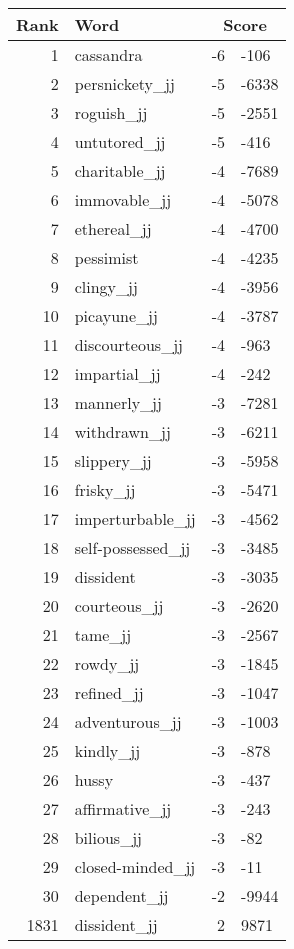 \begin{longtable}[!htbp]{| rlr@{.}l |}
    \hline
    \textbf{Rank} & \textbf{Word} & \multicolumn{2}{c|}{\textbf{Score}} \\
    \hline
    \endhead
    1 & cassandra & -6 & -106 \\
    2 & persnickety\_jj & -5 & -6338 \\
    3 & roguish\_jj & -5 & -2551 \\
    4 & untutored\_jj & -5 & -416 \\
    5 & charitable\_jj & -4 & -7689 \\
    6 & immovable\_jj & -4 & -5078 \\
    7 & ethereal\_jj & -4 & -4700 \\
    8 & pessimist & -4 & -4235 \\
    9 & clingy\_jj & -4 & -3956 \\
    10 & picayune\_jj & -4 & -3787 \\
    11 & discourteous\_jj & -4 & -963 \\
    12 & impartial\_jj & -4 & -242 \\
    13 & mannerly\_jj & -3 & -7281 \\
    14 & withdrawn\_jj & -3 & -6211 \\
    15 & slippery\_jj & -3 & -5958 \\
    16 & frisky\_jj & -3 & -5471 \\
    17 & imperturbable\_jj & -3 & -4562 \\
    18 & self-possessed\_jj & -3 & -3485 \\
    19 & dissident & -3 & -3035 \\
    20 & courteous\_jj & -3 & -2620 \\
    21 & tame\_jj & -3 & -2567 \\
    22 & rowdy\_jj & -3 & -1845 \\
    23 & refined\_jj & -3 & -1047 \\
    24 & adventurous\_jj & -3 & -1003 \\
    25 & kindly\_jj & -3 & -878 \\
    26 & hussy & -3 & -437 \\
    27 & affirmative\_jj & -3 & -243 \\
    28 & bilious\_jj & -3 & -82 \\
    29 & closed-minded\_jj & -3 & -11 \\
    30 & dependent\_jj & -2 & -9944 \\
    1831 & dissident\_jj & 2 & 9871 \\

\end{longtable}
